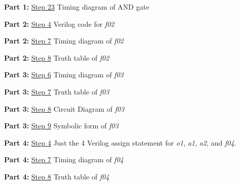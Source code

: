 \textbf{Part 1:} \protect\hyperlink{Part_1_Step_23}{Step 23} Timing
diagram of AND gate

\textbf{Part 2:} \protect\hyperlink{Part_2_Step_4}{Step 4} Verilog code
for \emph{f02}

\textbf{Part 2:} \protect\hyperlink{Part_2_Step_7}{Step 7} Timing
diagram of \emph{f02}

\textbf{Part 2:} \protect\hyperlink{Part_2_Step_8}{Step 8} Truth table
of \emph{f02}

\textbf{Part 3:} \protect\hyperlink{Part_3_Step_6}{Step 6} Timing
diagram of \emph{f03}

\textbf{Part 3:} \protect\hyperlink{Part_3_Step_7}{Step 7} Truth table
of \emph{f03}

\textbf{Part 3:} \protect\hyperlink{Part_3_Step_8}{Step 8} Circuit
Diagram of \emph{f03}

\textbf{Part 3:} \protect\hyperlink{Part_3_Step_9}{Step 9} Symbolic form
of \emph{f03}

\textbf{Part 4:} \protect\hyperlink{Part_4_Step_4}{Step 4} Just the 4
Verilog assign statement for \emph{o1}, \emph{a1}, \emph{a2}, and
\emph{f04}.

\textbf{Part 4:} \protect\hyperlink{Part_4_Step_7}{Step 7} Timing
diagram of \emph{f04}

\textbf{Part 4:} \protect\hyperlink{Part_4_Step_8}{Step 8} Truth table
of \emph{f04}


